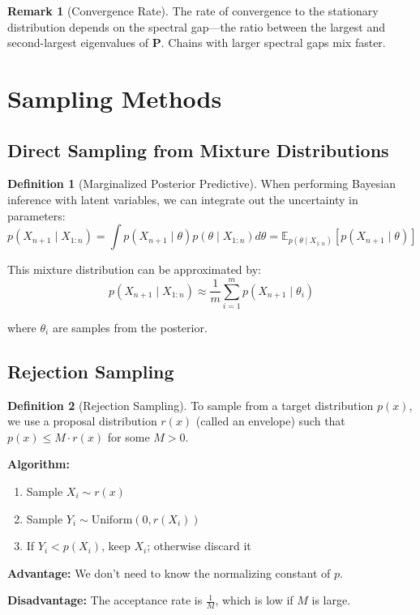 \documentclass[12pt,a4paper]{article}
\theoremstyle{definition}
\newtheorem{definition}{Definition}[section]
\newtheorem{remark}{Remark}[section]
\begin{document}
\begin{remark}[Convergence Rate]
The rate of convergence to the stationary distribution depends on the spectral gap—the ratio between the largest and second-largest eigenvalues of $\mathbf{P}$. Chains with larger spectral gaps mix faster.
\end{remark}

\section{Sampling Methods}

\subsection{Direct Sampling from Mixture Distributions}

\begin{definition}[Marginalized Posterior Predictive]
When performing Bayesian inference with latent variables, we can integrate out the uncertainty in parameters:
\[
p(X_{n+1} \mid X_{1:n}) = \int p(X_{n+1} \mid \theta) p(\theta \mid X_{1:n}) d\theta = \mathbb{E}_{p(\theta \mid X_{1:n})}[p(X_{n+1} \mid \theta)]
\]

This mixture distribution can be approximated by:
\[
p(X_{n+1} \mid X_{1:n}) \approx \frac{1}{m} \sum_{i=1}^m p(X_{n+1} \mid \theta_i)
\]

where $\theta_i$ are samples from the posterior.
\end{definition}

\subsection{Rejection Sampling}

\begin{definition}[Rejection Sampling]
To sample from a target distribution $p(x)$, we use a proposal distribution $r(x)$ (called an envelope) such that $p(x) \leq M \cdot r(x)$ for some $M > 0$.

\textbf{Algorithm:}
\begin{enumerate}
    \item Sample $X_i \sim r(x)$
    \item Sample $Y_i \sim \text{Uniform}(0, r(X_i))$
    \item If $Y_i < p(X_i)$, keep $X_i$; otherwise discard it
\end{enumerate}

\textbf{Advantage:} We don't need to know the normalizing constant of $p$.

\textbf{Disadvantage:} The acceptance rate is $\frac{1}{M}$, which is low if $M$ is large.
\end{definition}
\end{document}
